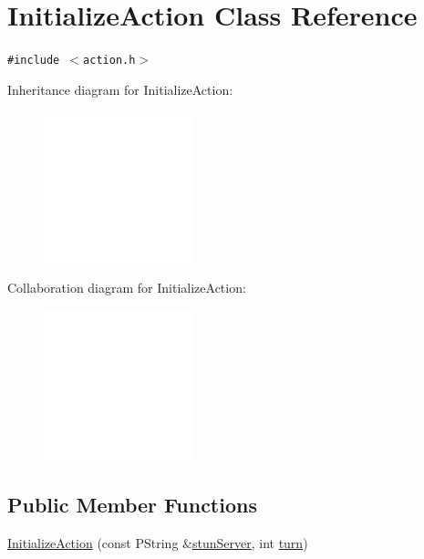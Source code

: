 \hypertarget{classInitializeAction}{
\section{InitializeAction Class Reference}
\label{classInitializeAction}
}
{\tt \#include $<$action.h$>$}

Inheritance diagram for InitializeAction:\nopagebreak
\begin{figure}[H]
\begin{center}
\leavevmode
\includegraphics[width=124pt]{classInitializeAction__inherit__graph}
\end{center}
\end{figure}
Collaboration diagram for InitializeAction:\nopagebreak
\begin{figure}[H]
\begin{center}
\leavevmode
\includegraphics[width=124pt]{classInitializeAction__coll__graph}
\end{center}
\end{figure}
\subsection*{Public Member Functions}
\begin{CompactItemize}
\item 
\hyperlink{classInitializeAction_984b7dd9f095a6601f81724bb7186587}{InitializeAction} (const PString \&\hyperlink{classInitializeAction_584d375d97a7b11ef7513dc709d9b8a5}{stunServer}, int \hyperlink{classAction_51e5d56a6aa4a037e90df19587a225c7}{turn})
\end{CompactItemize}
